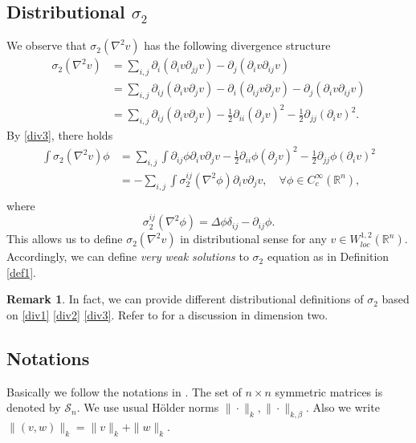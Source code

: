 \documentclass[reqno,12pt]{amsart}
\numberwithin{equation}{section}
\theoremstyle{plain}
\theoremstyle{definition}
\newtheorem{rem}[thm]{Remark}
\newcommand{\R}{\mathbb{R}}
\renewcommand{\S}{{\mathcal{S}_n}}
\begin{document}
\subsection{Distributional \texorpdfstring{$\sigma_2$}{sigma2}}
We observe that $\sigma_2(\nabla^2v)$ has the following divergence structure
\begin{align}
    \sigma_2(\nabla^2 v)
    &=\sum_{i,j}\partial_{i}(\partial_{i}v\partial_{jj}v)-\partial_{j}(\partial_{i}v\partial_{ij}v) \label{div1}\\
    &=\sum_{i,j}\partial_{ij}(\partial_{i}v\partial_{j}v)-\partial_{i}(\partial_{ij}v\partial_{j}v)
    -\partial_{j}(\partial_{i}v\partial_{ij}v) \label{div2}\\
    &=\sum_{i,j}\partial_{ij}(\partial_{i}v\partial_{j}v)
    -\frac{1}{2}\partial_{ii}(\partial_{j}v)^2
    -\frac{1}{2}\partial_{jj}(\partial_{i}v)^2. \label{div3}
\end{align}
By \eqref{div3}, there holds
\begin{align*}
    \int \sigma_2(\nabla^2 v)\phi
    &=\sum_{i,j}\int \partial_{ij}\phi \partial_{i}v\partial_{j}v-\frac{1}{2}\partial_{ii}\phi(\partial_{j}v)^2-\frac{1}{2}\partial_{jj}\phi(\partial_{i}v)^2\\
    &=-\sum_{i,j}\int \sigma_2^{ij}(\nabla^2\phi)\partial_i v\partial_j v,\quad \forall\phi\in C^\infty_c(\R^n),\\
\end{align*}
where
\begin{equation*}
\sigma_2^{ij}(\nabla^2\phi)=\Delta\phi\delta_{ij}-\partial_{ij}\phi.    
\end{equation*}
This allows us to define $\sigma_2(\nabla^2v)$ in distributional sense for any $v\in W^{1,2}_{loc}(\R^n)$. Accordingly, we can define \emph{very weak solutions} to $\sigma_2$ equation as in Definition \ref{def1}.

\begin{rem}
    In fact, we can provide different distributional definitions of $\sigma_2$ based on \eqref{div1} \eqref{div2} \eqref{div3}. Refer to \cite{iwaniec01concept} for a discussion in dimension two.
\end{rem}

\subsection{Notations}
Basically we follow the notations in \cite[Section 2]{cao19very}. The set of $n\times n$ symmetric matrices is denoted by $\S$. We use usual H\"older norms $\|\cdot\|_k,\|\cdot\|_{k,\beta}$. Also we write $\|(v,w)\|_k=\|v\|_k+\|w\|_k$.
\end{document}
